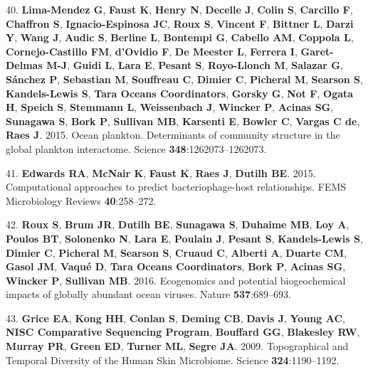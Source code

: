 \documentclass[12pt,]{article}
\begin{document}
\hypertarget{ref-LimaMendez:2015hw}{}
40. \textbf{Lima-Mendez G}, \textbf{Faust K}, \textbf{Henry N},
\textbf{Decelle J}, \textbf{Colin S}, \textbf{Carcillo F},
\textbf{Chaffron S}, \textbf{Ignacio-Espinosa JC}, \textbf{Roux S},
\textbf{Vincent F}, \textbf{Bittner L}, \textbf{Darzi Y}, \textbf{Wang
J}, \textbf{Audic S}, \textbf{Berline L}, \textbf{Bontempi G},
\textbf{Cabello AM}, \textbf{Coppola L}, \textbf{Cornejo-Castillo FM},
\textbf{d'Ovidio F}, \textbf{De Meester L}, \textbf{Ferrera I},
\textbf{Garet-Delmas M-J}, \textbf{Guidi L}, \textbf{Lara E},
\textbf{Pesant S}, \textbf{Royo-Llonch M}, \textbf{Salazar G},
\textbf{Sánchez P}, \textbf{Sebastian M}, \textbf{Souffreau C},
\textbf{Dimier C}, \textbf{Picheral M}, \textbf{Searson S},
\textbf{Kandels-Lewis S}, \textbf{Tara Oceans Coordinators},
\textbf{Gorsky G}, \textbf{Not F}, \textbf{Ogata H}, \textbf{Speich S},
\textbf{Stemmann L}, \textbf{Weissenbach J}, \textbf{Wincker P},
\textbf{Acinas SG}, \textbf{Sunagawa S}, \textbf{Bork P},
\textbf{Sullivan MB}, \textbf{Karsenti E}, \textbf{Bowler C},
\textbf{Vargas C de}, \textbf{Raes J}. 2015. Ocean plankton.
Determinants of community structure in the global plankton interactome.
Science \textbf{348}:1262073--1262073.

\hypertarget{ref-Edwards:2015iz}{}
41. \textbf{Edwards RA}, \textbf{McNair K}, \textbf{Faust K},
\textbf{Raes J}, \textbf{Dutilh BE}. 2015. Computational approaches to
predict bacteriophage-host relationships. FEMS Microbiology Reviews
\textbf{40}:258--272.

\hypertarget{ref-Roux:2016cc}{}
42. \textbf{Roux S}, \textbf{Brum JR}, \textbf{Dutilh BE},
\textbf{Sunagawa S}, \textbf{Duhaime MB}, \textbf{Loy A}, \textbf{Poulos
BT}, \textbf{Solonenko N}, \textbf{Lara E}, \textbf{Poulain J},
\textbf{Pesant S}, \textbf{Kandels-Lewis S}, \textbf{Dimier C},
\textbf{Picheral M}, \textbf{Searson S}, \textbf{Cruaud C},
\textbf{Alberti A}, \textbf{Duarte CM}, \textbf{Gasol JM}, \textbf{Vaqué
D}, \textbf{Tara Oceans Coordinators}, \textbf{Bork P}, \textbf{Acinas
SG}, \textbf{Wincker P}, \textbf{Sullivan MB}. 2016. Ecogenomics and
potential biogeochemical impacts of globally abundant ocean viruses.
Nature \textbf{537}:689--693.

\hypertarget{ref-Grice:2009eea}{}
43. \textbf{Grice EA}, \textbf{Kong HH}, \textbf{Conlan S},
\textbf{Deming CB}, \textbf{Davis J}, \textbf{Young AC}, \textbf{NISC
Comparative Sequencing Program}, \textbf{Bouffard GG}, \textbf{Blakesley
RW}, \textbf{Murray PR}, \textbf{Green ED}, \textbf{Turner ML},
\textbf{Segre JA}. 2009. Topographical and Temporal Diversity of the
Human Skin Microbiome. Science \textbf{324}:1190--1192.
\end{document}

